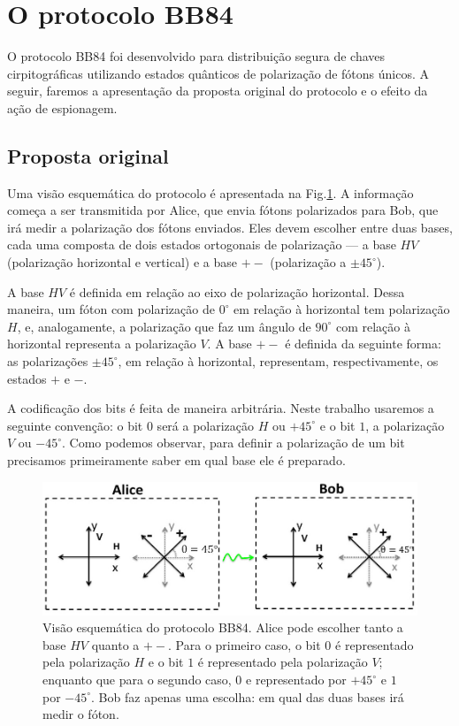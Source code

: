 \documentclass[pra, twocolumn]{revtex4}
\begin{document}
\section{O protocolo BB84}
\label{bb84}

O protocolo BB84 foi desenvolvido para distribui\c c\~ao segura de chaves cirpitogr\'aficas utilizando estados qu\^anticos de polarização de f\'otons \'unicos.  A seguir, faremos a apresenta\c c\~ao da proposta original do protocolo e o efeito da a\c c\~ao de espionagem.

\subsection{Proposta original}
\label{origprop}

Uma vis\~ao esquem\'atica do protocolo \'e apresentada na Fig.\ref{basis}. A informa\c c\~ao come\c ca a ser transmitida por Alice, que envia f\'otons polarizados para Bob, que ir\'a medir a polariza\c c\~ao dos f\'otons enviados. Eles devem escolher entre duas bases, cada uma composta de dois estados ortogonais de polariza\c c\~ao --- a base $HV$ (polariza\c c\~ao horizontal e vertical) e a base  $+-$ (polariza\c c\~ao a $\pm 45^\circ$).

A base $HV$ \'e definida em rela\c c\~ao ao eixo de polariza\c c\~ao horizontal. Dessa maneira, um f\'oton com polariza\c c\~ao de  $0^\circ$ em rela\c c\~ao \`a horizontal tem polariza\c c\~ao $H$, e, analogamente, a polariza\c c\~ao que faz um \^angulo de $90^\circ$ com rela\c c\~ao \`a horizontal representa a polariza\c c\~ao $V$. A base $+-$ \'e definida da seguinte forma: as polariza\c c\~oes $\pm 45^\circ$, em rela\c c\~ao \`a horizontal, representam, respectivamente, os estados $+$ e $-$.

A codifica\c c\~ao dos bits \'e feita de maneira arbitr\'aria. Neste trabalho usaremos a seguinte conven\c c\~ao: o bit $0$ ser\'a a polariza\c c\~ao $H$ ou $+45^\circ$ e o bit $1$, a polariza\c c\~ao $V$ ou $-45^\circ$. Como podemos observar, para definir a polariza\c c\~ao de um bit precisamos primeiramente saber em qual base ele \'e preparado.

\begin{figure} [H]
     \centering
     \includegraphics[scale=0.5,trim=0cm 5cm 0cm 4cm, clip=true,width =8.5 cm, height=3.8 cm]{fig1.jpg}
     \caption[Vis\~ao esquem\'atica do protocolo BB84.]{Vis\~ao esquem\'atica do protocolo BB84. Alice pode escolher tanto a base $HV$ quanto a $+-$. Para o primeiro caso, o bit $0$ \'e representado pela polariza\c c\~ao $H$ e o bit $1$ \'e representado pela polariza\c c\~ao $V$; enquanto que para o segundo caso, $0$ e representado por $+45^\circ$ e $1$ por $-45^\circ$. Bob faz apenas uma escolha: em qual das duas bases ir\'a medir o f\'oton.}
     \label{basis}
\end{figure}
\end{document}
